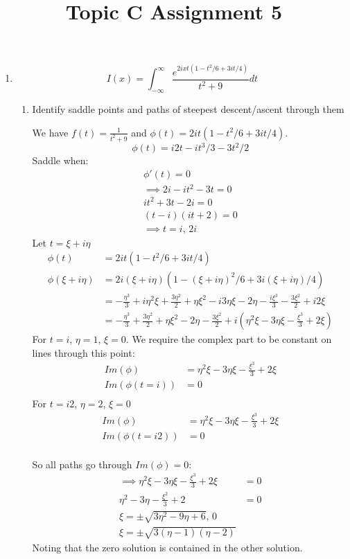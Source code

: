 \documentclass{X:/Documents/Coding/Latex/myassignment}
\title{Topic C Assignment 5}
\begin{document}
\maketitle
\begin{enumerate}
	\item 
	\[I(x) = \int_{-\infty}^{\infty} \frac{e^{2ixt(1-t^2/6+3it/4)}}{t^2+9} dt\] 

	\begin{enumerate}
		\item Identify saddle points and paths of steepest descent/ascent through them
		

		We have $f(t) = \frac{1}{t^2+9}$ and $\phi(t) = 2it(1-t^2/6+3it/4)$.
		\[\phi(t) = i2t-it^3/3-3t^2/2\]
		Saddle when:
		\begin{align*}
			\phi'(t) = 0\\
			\implies 2i - it^2 -3t =0\\
			it^2 + 3t - 2i = 0\\
			(t-i)(it+2) =0\\
			\implies t = i,\, 2i
		\end{align*}
		Let $t = \xi + i\eta$
		\begin{align*}
			\phi(t) &=  2it(1-t^2/6+3it/4)\\
			\phi(\xi+i\eta) &= 2i(\xi+i\eta)\left(1 - (\xi+i\eta)^2/6 + 3i(\xi+i\eta)/4\right)\\
			&= -\frac{\eta^3}{3}+i\eta^2 \xi +\frac{3\eta ^2}{2}+\eta  \xi^2-i3\eta \xi - 2\eta -\frac{i\xi ^3 }{3}-\frac{3 \xi ^2}{2}+i2\xi\\
			&= -\frac{\eta ^3}{3}+\frac{3\eta ^2}{2}+\eta\xi^2-2\eta -\frac{3\xi ^2}{2}+ i\left(\eta ^2\xi -3\eta\xi -\frac{\xi ^3}{3}+2\xi\right)
		\end{align*}
		For $t=i$, $\eta = 1$, $\xi = 0$. We require the complex part to be constant on lines through this point:
		\begin{align*}
			Im(\phi) &= \eta ^2\xi -3\eta\xi -\frac{\xi ^3}{3}+2\xi\\
			Im(\phi(t=i))&=0\\					
		\end{align*}
		For $t=i2$, $\eta = 2$, $\xi = 0$
		\begin{align*}
			Im(\phi) &= \eta ^2\xi -3\eta\xi -\frac{\xi ^3}{3}+2\xi\\
			Im(\phi(t=i2))&=0\\		
		\end{align*}

		So all paths go through $Im(\phi) = 0$:
		\begin{align*}
			\implies \eta^2 \xi - 3\eta\xi - \frac{\xi^3}{3} + 2\xi &=0\\
			\eta^ 2- 3\eta - \frac{\xi^2}{3} + 2 &=0\\
			\xi = \pm\sqrt{3\eta^2 - 9\eta + 6 },\, 0\\
			\xi = \pm \sqrt{3(\eta-1)(\eta-2)}
		\end{align*}
		Noting that the zero solution is contained in the other solution.


\end{enumerate}
\end{enumerate}
\end{document}
